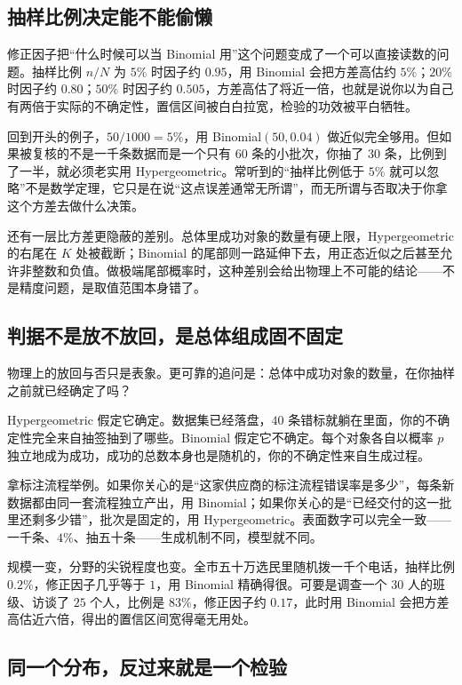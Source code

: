 \subsection{抽样比例决定能不能偷懒}

修正因子把``什么时候可以当 Binomial 用''这个问题变成了一个可以直接读数的问题。抽样比例 \(n/N\) 为 \(5\%\) 时因子约 \(0.95\)，用 Binomial 会把方差高估约 \(5\%\)；\(20\%\) 时因子约 \(0.80\)；\(50\%\) 时因子约 \(0.505\)，方差高估了将近一倍，也就是说你以为自己有两倍于实际的不确定性，置信区间被白白拉宽，检验的功效被平白牺牲。

回到开头的例子，\(50/1000=5\%\)，用 Binomial\((50,0.04)\) 做近似完全够用。但如果被复核的不是一千条数据而是一个只有 \(60\) 条的小批次，你抽了 \(30\) 条，比例到了一半，就必须老实用 Hypergeometric。常听到的``抽样比例低于 \(5\%\) 就可以忽略''不是数学定理，它只是在说``这点误差通常无所谓''，而无所谓与否取决于你拿这个方差去做什么决策。

还有一层比方差更隐蔽的差别。总体里成功对象的数量有硬上限，Hypergeometric 的右尾在 \(K\) 处被截断；Binomial 的尾部则一路延伸下去，用正态近似之后甚至允许非整数和负值。做极端尾部概率时，这种差别会给出物理上不可能的结论——不是精度问题，是取值范围本身错了。

\subsection{判据不是放不放回，是总体组成固不固定}

物理上的放回与否只是表象。更可靠的追问是：总体中成功对象的数量，在你抽样之前就已经确定了吗？

Hypergeometric 假定它确定。数据集已经落盘，\(40\) 条错标就躺在里面，你的不确定性完全来自抽签抽到了哪些。Binomial 假定它不确定。每个对象各自以概率 \(p\) 独立地成为成功，成功的总数本身也是随机的，你的不确定性来自生成过程。

拿标注流程举例。如果你关心的是``这家供应商的标注流程错误率是多少''，每条新数据都由同一套流程独立产出，用 Binomial；如果你关心的是``已经交付的这一批里还剩多少错''，批次是固定的，用 Hypergeometric。表面数字可以完全一致——一千条、\(4\%\)、抽五十条——生成机制不同，模型就不同。

规模一变，分野的尖锐程度也变。全市五十万选民里随机拨一千个电话，抽样比例 \(0.2\%\)，修正因子几乎等于 \(1\)，用 Binomial 精确得很。可要是调查一个 \(30\) 人的班级、访谈了 \(25\) 个人，比例是 \(83\%\)，修正因子约 \(0.17\)，此时用 Binomial 会把方差高估近六倍，得出的置信区间宽得毫无用处。

\subsection{同一个分布，反过来就是一个检验}

